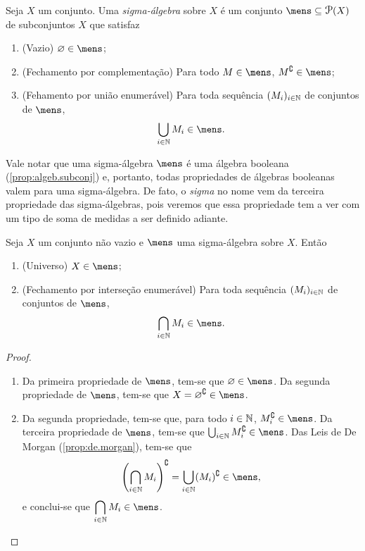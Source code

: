 \begin{defi}
Seja $X$ um conjunto. Uma \emph{sigma-álgebra} sobre $X$ é um conjunto $\mens \subseteq \p(X)$ de subconjuntos $X$ que satisfaz
	\begin{enumerate}
	\item (Vazio) $\emptyset \in \mens$;
	\item (Fechamento por complementação) Para todo $M \in \mens$, $M^\complement \in \mens$;
	\item (Fehamento por união enumerável) Para toda sequência $(M_i)_{i \in \mathbb{N}}$ de conjuntos de $\mens$,
	\begin{equation*}
	\bigcup_{i \in \N} M_i \in \mens.
	\end{equation*}
	\end{enumerate}
\end{defi}

	Vale notar que uma sigma-álgebra $\mens$ é uma álgebra booleana (\ref{prop:algeb.subconj}) e, portanto, todas propriedades de álgebras booleanas valem para uma sigma-álgebra. De fato, o \textit{sigma} no nome vem da terceira propriedade das sigma-álgebras, pois veremos que essa propriedade tem a ver com um tipo de soma de medidas a ser definido adiante.

\begin{prop}
	Seja $X$ um conjunto não vazio e $\mens$ uma sigma-álgebra sobre $X$. Então
	\begin{enumerate}
	\item (Universo) $X \in \mens$;
	\item (Fechamento por interseção enumerável) Para toda sequência $(M_i)_{i \in \mathbb{N}}$ de conjuntos de $\mens$,
	\begin{equation*}
	\bigcap_{i \in \N} M_i \in \mens.
	\end{equation*}
	\end{enumerate}
\end{prop}
\begin{proof}
	\begin{enumerate}
	\item Da primeira propriedade de $\mens$, tem-se que $\emptyset \in \mens$. Da segunda propriedade de $\mens$, tem-se que $X = \emptyset^\complement \in \mens$.
	\item Da segunda propriedade, tem-se que, para todo $i \in \mathbb{N}$, $M_i^\complement \in \mens$. Da terceira propriedade de $\mens$, tem-se que $\bigcup_{i \in \N} M_i^\complement \in \mens$. Das Leis de De Morgan (\ref{prop:de.morgan}), tem-se que
	\begin{equation*}
	\left(\bigcap_{i \in \N} M_i \right)^\complement = \bigcup_{i \in \N} (M_i)^\complement \in \mens,
	\end{equation*}
e conclui-se que $\displaystyle\bigcap_{i \in \N} M_i \in \mens$.
	\end{enumerate}
\end{proof}

